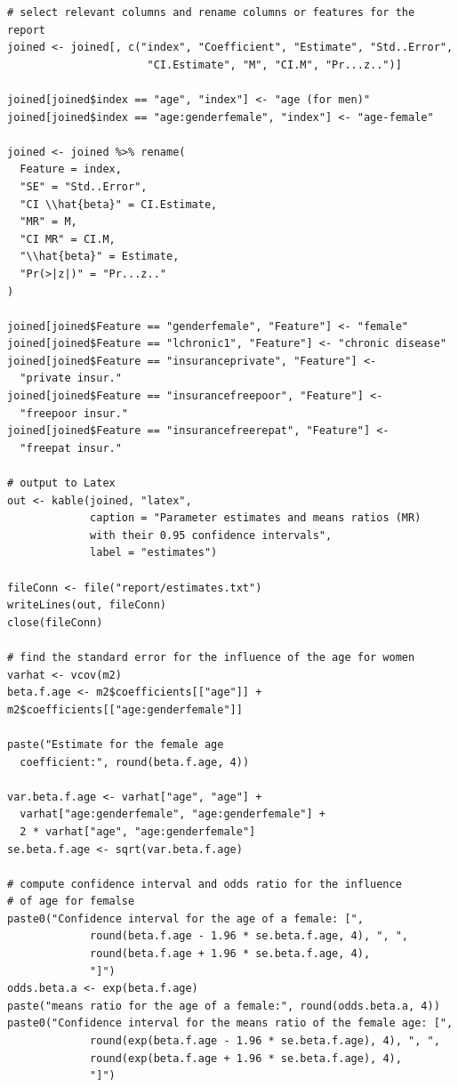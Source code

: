 \documentclass[a4paper,11pt]{article}
\begin{document}
\begin{verbatim}
# select relevant columns and rename columns or features for the report
joined <- joined[, c("index", "Coefficient", "Estimate", "Std..Error",
                      "CI.Estimate", "M", "CI.M", "Pr...z..")]

joined[joined$index == "age", "index"] <- "age (for men)"
joined[joined$index == "age:genderfemale", "index"] <- "age-female"

joined <- joined %>% rename(
  Feature = index,
  "SE" = "Std..Error",
  "CI \\hat{beta}" = CI.Estimate,
  "MR" = M,
  "CI MR" = CI.M,
  "\\hat{beta}" = Estimate,
  "Pr(>|z|)" = "Pr...z.."
)

joined[joined$Feature == "genderfemale", "Feature"] <- "female"
joined[joined$Feature == "lchronic1", "Feature"] <- "chronic disease"
joined[joined$Feature == "insuranceprivate", "Feature"] <-
  "private insur."
joined[joined$Feature == "insurancefreepoor", "Feature"] <-
  "freepoor insur."
joined[joined$Feature == "insurancefreerepat", "Feature"] <-
  "freepat insur."

# output to Latex
out <- kable(joined, "latex",
             caption = "Parameter estimates and means ratios (MR)
             with their 0.95 confidence intervals",
             label = "estimates")

fileConn <- file("report/estimates.txt")
writeLines(out, fileConn)
close(fileConn)

# find the standard error for the influence of the age for women
varhat <- vcov(m2)
beta.f.age <- m2$coefficients[["age"]] + m2$coefficients[["age:genderfemale"]]

paste("Estimate for the female age
  coefficient:", round(beta.f.age, 4))

var.beta.f.age <- varhat["age", "age"] +
  varhat["age:genderfemale", "age:genderfemale"] +
  2 * varhat["age", "age:genderfemale"]
se.beta.f.age <- sqrt(var.beta.f.age)

# compute confidence interval and odds ratio for the influence
# of age for femalse
paste0("Confidence interval for the age of a female: [",
             round(beta.f.age - 1.96 * se.beta.f.age, 4), ", ",
             round(beta.f.age + 1.96 * se.beta.f.age, 4),
             "]")
odds.beta.a <- exp(beta.f.age)
paste("means ratio for the age of a female:", round(odds.beta.a, 4))
paste0("Confidence interval for the means ratio of the female age: [",
             round(exp(beta.f.age - 1.96 * se.beta.f.age), 4), ", ",
             round(exp(beta.f.age + 1.96 * se.beta.f.age), 4),
             "]")


\end{verbatim}
\end{document}
